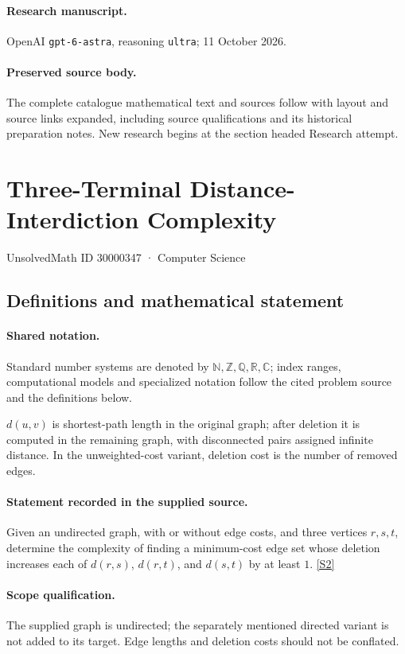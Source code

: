 \documentclass[11pt]{article}
\begin{document}
\paragraph{Research manuscript.} OpenAI \texttt{gpt-6-astra}, reasoning \texttt{ultra}; 11 October 2026.
\paragraph{Preserved source body.} The complete catalogue mathematical text and sources follow with layout and source links expanded, including source qualifications and its historical preparation notes. New research begins at the section headed Research attempt.

\section{Three-Terminal Distance-Interdiction Complexity}\label{30000347}
{\small UnsolvedMath ID 30000347 · Computer Science}
\subsection{Definitions and mathematical statement}

\paragraph{Shared notation.}Standard number systems are denoted by $\mathbb N,\mathbb Z,\mathbb Q,\mathbb R,\mathbb C$; index ranges, computational models and specialized notation follow the cited problem source and the definitions below.


$d(u,v)$ is shortest-path length in the original graph; after deletion it is computed in the remaining graph, with disconnected pairs assigned infinite distance. In the unweighted-cost variant, deletion cost is the number of removed edges.
\paragraph{Statement recorded in the supplied source.}
Given an undirected graph, with or without edge costs, and three vertices $r,s,t$, determine the complexity of finding a minimum-cost edge set whose deletion increases each of $d(r,s)$, $d(r,t)$, and $d(s,t)$ by at least $1$. \href{https://doi.org/10.4171/owr/2005/50}{[S2]}
\paragraph{Scope qualification.}
The supplied graph is undirected; the separately mentioned directed variant is not added to its target. Edge lengths and deletion costs should not be conflated.
\end{document}
